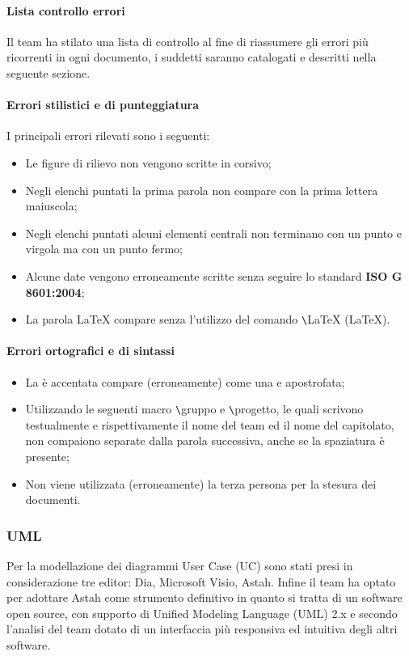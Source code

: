 \paragraph{Lista controllo errori}
Il team ha stilato una lista di controllo al fine di riassumere gli errori più ricorrenti in ogni documento, i suddetti saranno catalogati e descritti nella seguente sezione.
\paragraph{Errori stilistici e di punteggiatura}
I principali errori rilevati sono i seguenti:
\begin{itemize}
\item Le figure di rilievo non vengono scritte in corsivo;
\item Negli elenchi puntati la prima parola non compare con la prima lettera maiuscola;
\item Negli elenchi puntati alcuni elementi centrali non terminano con un punto e virgola ma con un punto fermo;
\item Alcune date vengono erroneamente scritte senza seguire lo standard \textbf{ISO G 8601:2004};
\item La parola LaTeX compare senza l'utilizzo del comando \verb+\+LaTeX (\LaTeX).
\end{itemize}
\paragraph{Errori ortografici e di sintassi}
\begin{itemize}
\item La è accentata compare (erroneamente) come una e apostrofata;
\item Utilizzando le seguenti macro \verb+\+gruppo e \verb+\+progetto, le quali scrivono testualmente e rispettivamente il nome del team ed il nome del capitolato, non compaiono separate dalla parola successiva, anche se la spaziatura è presente;
\item Non viene utilizzata (erroneamente) la terza persona per la stesura dei documenti.
\end{itemize}
\subsubsection{UML}
Per la modellazione dei diagrammi User Case (UC) sono stati presi in considerazione tre editor: Dia, Microsoft Visio, Astah. Infine il team ha optato per adottare Astah come strumento definitivo in quanto si tratta di un software open source, con supporto di Unified Modeling Language (UML) 2.x  e secondo l'analisi del team dotato di un interfaccia più responsiva ed intuitiva degli altri software.


